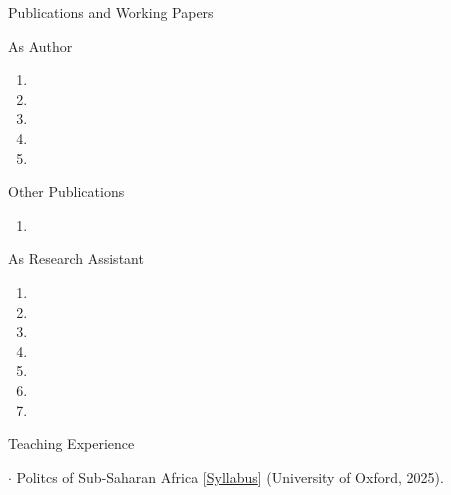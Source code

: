 \documentclass[10pt]{resume} %
\begin{document}
	
	\begin{rSection}{Publications and Working Papers}\itemsep -5pt
		
	\begin{rSubsection}{As Author}{}{}{}
  \begin{enumerate}
	\item {}
	\item {}
    \item {}
    \item {}
    \item {}
  \end{enumerate}
  \end{rSubsection}
  
  	\begin{rSubsection}{Other Publications}{}{}{}
  \begin{enumerate}
    \item {}
  \end{enumerate}
  \end{rSubsection}
  
  \begin{rSubsection}{As Research Assistant}{}{}{}
  \begin{enumerate}
    \item {}
    \item {}
    \item {}
    \item {}
    \item {}
    \item {}
    \item {}
  \end{enumerate}
	\end{rSubsection}

	\end{rSection}
	
	\begin{rSection}{Teaching Experience}
		\itemsep -5pt
		\item $\cdot$ Politcs of Sub-Saharan Africa [\href{https://www.dropbox.com/scl/fi/kdpz9gtizl9kawvx6ofcc/2025TT_pssa_syllabus.pdf?rlkey=9f8o4wifurtrib32oxmjdtffi&dl=0}{Syllabus}] (University of Oxford, 2025).
	\end{rSection}
\end{document}
